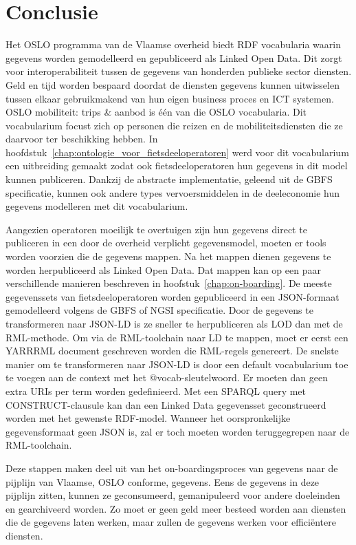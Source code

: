 \chapter{Conclusie}
\label{chap:conclusie}
Het OSLO programma van de Vlaamse overheid biedt RDF vocabularia waarin gegevens worden gemodelleerd en gepubliceerd als Linked Open Data. Dit zorgt voor interoperabiliteit tussen de gegevens van honderden publieke sector diensten. Geld en tijd worden bespaard doordat de diensten gegevens kunnen uitwisselen tussen elkaar gebruikmakend van hun eigen business proces en ICT systemen.
OSLO mobiliteit: trips \& aanbod is één van die OSLO vocabularia. Dit vocabularium focust zich op personen die reizen en de mobiliteitsdiensten die ze daarvoor ter beschikking hebben. In hoofdstuk~\ref{chap:ontologie_voor_fietsdeeloperatoren} werd voor dit vocabularium een uitbreiding gemaakt zodat ook fietsdeeloperatoren hun gegevens in dit model kunnen publiceren. Dankzij de abstracte implementatie, geleend uit de GBFS specificatie, kunnen ook andere types vervoersmiddelen in de deeleconomie hun gegevens modelleren met dit vocabularium.

Aangezien operatoren moeilijk te overtuigen zijn hun gegevens direct te publiceren in een door de overheid verplicht gegevensmodel, moeten er tools worden voorzien die de gegevens mappen. Na het mappen dienen gegevens te worden herpubliceerd  als Linked Open Data. Dat mappen kan op een paar verschillende manieren beschreven in hoofstuk~\ref{chap:on-boarding}. De meeste gegevenssets van fietsdeeloperatoren worden gepubliceerd in een JSON-formaat gemodelleerd volgens de GBFS of NGSI specificatie. Door de gegevens te transformeren naar JSON-LD is ze sneller te herpubliceren als LOD dan met de RML-methode. Om via de RML-toolchain naar LD te mappen, moet er eerst een YARRRML document geschreven worden die RML-regels genereert. De snelste manier om te transformeren naar JSON-LD is door een default vocabularium toe te voegen aan de context met het @vocab-sleutelwoord. Er moeten dan geen extra URIs per term worden gedefinieerd. Met een SPARQL query met CONSTRUCT-clausule kan dan een Linked Data gegevensset geconstrueerd worden met het gewenste RDF-model. Wanneer het oorspronkelijke gegevensformaat geen JSON is, zal er toch moeten worden teruggegrepen naar de RML-toolchain.

Deze stappen maken deel uit van het on-boardingsproces van gegevens naar de pijplijn van Vlaamse, OSLO conforme, gegevens. Eens de gegevens in deze pijplijn zitten, kunnen ze geconsumeerd, gemanipuleerd voor andere doeleinden en gearchiveerd worden. Zo moet er geen geld meer besteed worden aan diensten die de gegevens laten werken, maar zullen de gegevens werken voor efficiëntere diensten.